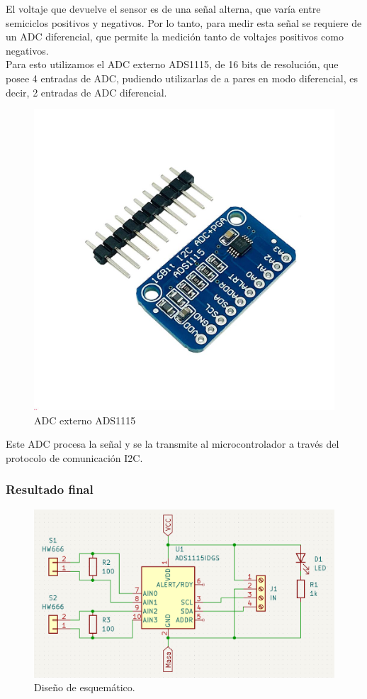 
El voltaje que devuelve el sensor es de una señal alterna, que varía entre semiciclos positivos y negativos. Por lo tanto, para medir esta señal se requiere de un ADC diferencial, que permite la medición tanto de voltajes positivos como negativos.\\

Para esto utilizamos el ADC externo ADS1115, de 16 bits de resolución, que posee 4 entradas de ADC, pudiendo utilizarlas de a pares en modo diferencial, es decir, 2 entradas de ADC diferencial.\\

\begin{figure}[H]
    \centering
    \includegraphics[width=0.5\linewidth]{hardware/ads1115.jpg}
    \caption{ADC externo ADS1115}
    \label{fig:ads1115}
\end{figure}

Este ADC procesa la señal y se la transmite al microcontrolador a través del protocolo de comunicación I2C.\\

\subsubsection{Resultado final}

\begin{figure}[H]
    \centering
    \includegraphics[width=0.9\linewidth]{hardware/Screenshot_11.png}
    \caption{Diseño de esquemático.}
    \label{fig:sch-corr}
\end{figure}

